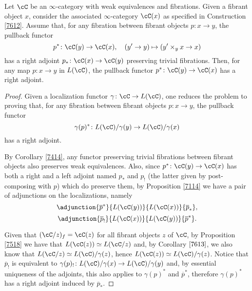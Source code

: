 \begin{thm}\label{7616}

  Let $\cC$ be an $\infty$-category with weak equivalences and fibrations. Given
  a fibrant object $x$, consider the associated $\infty$-category $\cC(x)$ as
  specified in Construction \ref{7612}.
  Assume that, for any fibration between fibrant objects
  $p\colon x\rightarrow y$, the pullback functor
  \[p^*\colon\cC(y)\rightarrow\cC(x),\quad (y'\rightarrow y)\mapsto(y'\times_y
  x\rightarrow x)\] has a right adjoint $p_*\colon\cC(x)\rightarrow\cC(y)$
  preserving trivial fibrations. Then, for any map $p\colon x\rightarrow y$ in
  $L(\cC)$, the pullback functor $p^*\colon\cC(y)\rightarrow\cC(x)$ has a right
  adjoint.
\end{thm}
\begin{proof}

  Given a localization functor $\gamma\colon\cC\rightarrow L(\cC)$, one reduces
  the problem to proving that, for any fibration between fibrant objects
  $p\colon x\rightarrow y$, the pullback functor
  \[\gamma(p)^*\colon L(\cC)/\gamma(y)\rightarrow L(\cC)/\gamma(x)\]
  has a right adjoint.

  \noindent
  By Corollary \ref{7414}, any functor preserving
  trivial fibrations between fibrant objects also preserves weak equivalences.
  Also, since $p^*\colon\cC(y)\rightarrow\cC(x)$ has both a right and a left
  adjoint named $p_*$ and $p_!$ (the latter given by post-composing with $p$)
  which do preserve them, by Proposition \ref{7114} we have a pair of
  adjunctions on the localizations, namely
  \[\adjunction{\overline{p}^*}{L(\cC(y))}{L(\cC(x))}{\overline{p}_*},\]
  \[\adjunction{\overline{p}_!}{L(\cC(x))}{L(\cC(y))}{\overline{p}^*}.\]

  \noindent
  Given that $(\cC/z)_f=\cC(z)$ for all fibrant objects $z$ of $\cC$, by
  Proposition \ref{7518} we have that $L(\cC(z))\simeq L(\cC/z)$ and, by
  Corollary $\ref{7613}$, we also know that $L(\cC/z)\simeq L(\cC)/\gamma(z)$, hence
  $L(\cC(z))\simeq L(\cC)/\gamma(z)$. Notice that $\overline{p}_!$ is equivalent
  to $\gamma(p)_!\colon L(\cC)/\gamma(x)\rightarrow L(\cC)/\gamma(y)$ and, by
  essential uniqueness of the adjoints, this also applies to $\gamma(p)^*$ and
  $\overline{p}^*$, therefore $\gamma(p)^*$ has a right adjoint induced by
  $\overline{p}_*$.
\end{proof}

